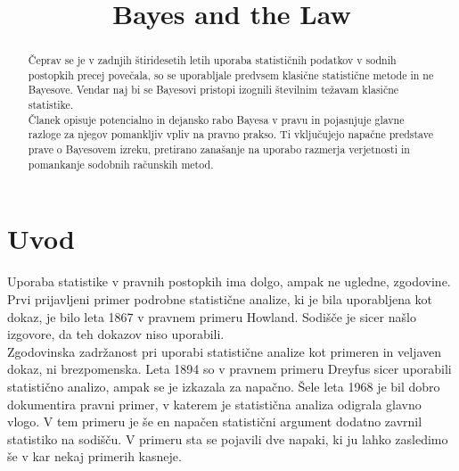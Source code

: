 \documentclass[a4paper,12pt]{article}
\begin{document}
\title{Bayes and the Law}
\maketitle

\begin{abstract}
    Čeprav se je v zadnjih štiridesetih letih uporaba statističnih podatkov v sodnih postopkih precej povečala, so se uporabljale predvsem 
    klasične statistične metode in ne Bayesove. Vendar naj bi se Bayesovi pristopi izognili številnim težavam klasične statistike. \\
    Članek opisuje potencialno in dejansko rabo Bayesa v pravu in pojasnjuje glavne razloge za njegov pomankljiv vpliv na pravno prakso.  Ti 
    vključujejo napačne predstave prave o Bayesovem izreku, pretirano zanašanje na uporabo razmerja verjetnosti in pomankanje sodobnih 
    računskih metod. 
\end{abstract}

\section{Uvod}
Uporaba statistike v pravnih postopkih ima dolgo, ampak ne ugledne, zgodovine. Prvi prijavljeni primer podrobne statistične analize, ki je bila 
uporabljena kot dokaz, je bilo leta 1867 v pravnem primeru Howland. Sodišče je sicer našlo izgovore, da teh dokazov niso uporabili. \\
Zgodovinska zadržanost pri uporabi statistične analize kot primeren in veljaven dokaz, ni brezpomenska. Leta 1894 so v pravnem primeru Dreyfus 
sicer uporabili statistično analizo, ampak se je izkazala za napačno. Šele leta 1968 je bil dobro dokumentira pravni primer, v katerem je 
statistična analiza odigrala glavno vlogo. V tem primeru je še en napačen statistični argument dodatno zavrnil statistiko na sodišču. 
V primeru sta se pojavili dve napaki, ki ju lahko zasledimo še v kar nekaj primerih kasneje. \\ \\
\end{document}
